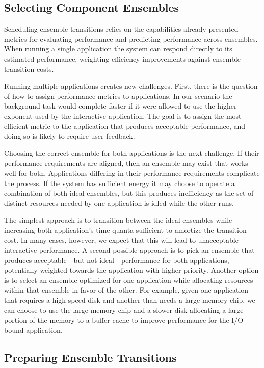 \subsection{Selecting Component Ensembles}
\label{subsec-select}

Scheduling ensemble transitions relies on the capabilities already
presented---metrics for evaluating performance and predicting performance
across ensembles. When running a single application the system can respond
directly to its estimated performance, weighting efficiency improvements
against ensemble transition costs.

Running multiple applications creates new challenges. First, there is the
question of how to assign performance metrics to applications. In our
scenario the background task would complete faster if it were allowed to use
the higher exponent used by the interactive application. The goal is to
assign the most efficient metric to the application that produces acceptable
performance, and doing so is likely to require user feedback.

Choosing the correct ensemble for both applications is the next challenge. If
their performance requirements are aligned, then an ensemble may exist that
works well for both. Applications differing in their performance requirements
complicate the process. If the system has sufficient energy it may choose to
operate a combination of both ideal ensembles, but this produces inefficiency
as the set of distinct resources needed by one application is idled while the
other runs.

The simplest approach is to transition between the ideal ensembles while
increasing both application's time quanta sufficient to amortize the
transition cost. In many cases, however, we expect that this will lead to
unacceptable interactive performance. A second possible approach is to pick
an ensemble that produces acceptable---but not ideal---performance for both
applications, potentially weighted towards the application with higher
priority. Another option is to select an ensemble optimized for one
application while allocating resources within that ensemble in favor of the
other. For example, given one application that requires a high-speed disk and
another than needs a large memory chip, we can choose to use the large memory
chip and a slower disk allocating a large portion of the memory to a buffer
cache to improve performance for the I/O-bound application.

\subsection{Preparing Ensemble Transitions}
\label{subsec-prepare}

